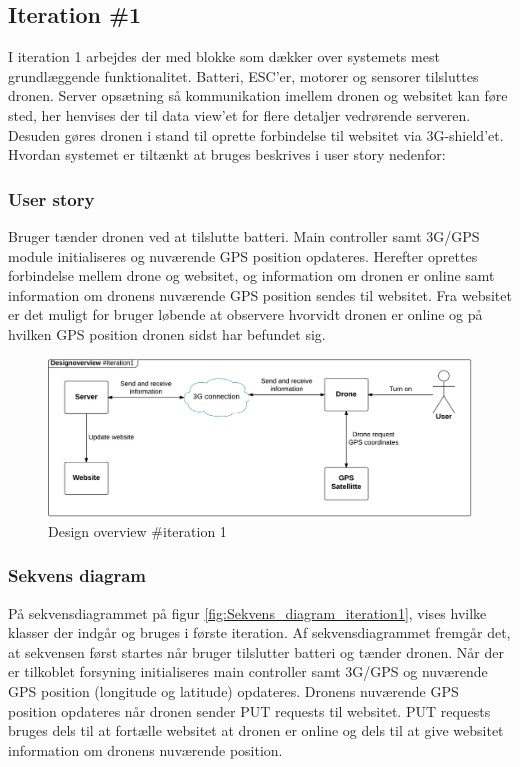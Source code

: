 \subsection{Iteration \#1}
I iteration 1 arbejdes der med blokke som dækker over systemets mest grundlæggende funktionalitet. Batteri,
ESC’er, motorer og sensorer tilsluttes dronen. Server opsætning så kommunikation imellem dronen og websitet kan føre sted, her henvises der til data view'et for flere detaljer vedrørende serveren. Desuden gøres dronen i stand til oprette forbindelse til websitet via 3G-shield’et. Hvordan systemet er tiltænkt at bruges beskrives i user story nedenfor:

\subsubsection*{User story}
Bruger tænder dronen ved at tilslutte batteri. Main controller samt 3G/GPS module initialiseres og nuværende GPS position opdateres. Herefter oprettes forbindelse mellem drone og websitet, og information om dronen er online samt information om dronens nuværende GPS position sendes til websitet. Fra websitet er det muligt for bruger løbende at observere hvorvidt dronen er online og på hvilken GPS position dronen sidst har befundet sig.

\begin{figure}[H]
	\centering
	\includegraphics[width=1\textwidth]{Billeder/design_overview/design_overview_iteration1.png}
	\vspace{-.5cm}
	\caption{Design overview \#iteration 1}
	\label{fig:design_overview_UC1}
\end{figure}


\newpage
\subsubsection*{Sekvens diagram}
På sekvensdiagrammet på figur \ref{fig:Sekvens_diagram_iteration1}, vises hvilke klasser der indgår og bruges i første iteration. Af sekvensdiagrammet fremgår det, at sekvensen først startes når bruger tilslutter batteri og tænder dronen. Når der er tilkoblet forsyning initialiseres main controller samt 3G/GPS og nuværende GPS position  (longitude og latitude) opdateres. Dronens nuværende GPS position opdateres når dronen sender PUT requests til websitet. PUT requests bruges dels til at fortælle websitet at dronen er online og dels til at give websitet information om dronens nuværende position. 


